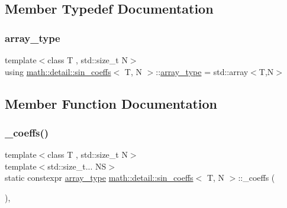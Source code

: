 \subsection{Member Typedef Documentation}
\mbox{\label{structmath_1_1detail_1_1sin__coeffs_a6d08252591f05c40e48bf7931b2eb135}} 
\subsubsection{\texorpdfstring{array\+\_\+type}{array\_type}}
{\footnotesize\ttfamily template$<$class T , std\+::size\+\_\+t N$>$ \\
using \hyperlink{structmath_1_1detail_1_1sin__coeffs}{math\+::detail\+::sin\+\_\+coeffs}$<$ T, N $>$\+::\hyperlink{structmath_1_1detail_1_1sin__coeffs_a6d08252591f05c40e48bf7931b2eb135}{array\+\_\+type} =  std\+::array$<$T,N$>$}



\subsection{Member Function Documentation}
\mbox{\label{structmath_1_1detail_1_1sin__coeffs_a1c5e8b54d12b2320c994c4eaf7b69b61}} 
\subsubsection{\texorpdfstring{\+\_\+coeffs()}{\_coeffs()}}
{\footnotesize\ttfamily template$<$class T , std\+::size\+\_\+t N$>$ \\
template$<$std\+::size\+\_\+t... NS$>$ \\
static constexpr \hyperlink{structmath_1_1detail_1_1sin__coeffs_a6d08252591f05c40e48bf7931b2eb135}{array\+\_\+type} \hyperlink{structmath_1_1detail_1_1sin__coeffs}{math\+::detail\+::sin\+\_\+coeffs}$<$ T, N $>$\+::\+\_\+coeffs (\begin{DoxyParamCaption}\item[{\hyperlink{structmath_1_1detail_1_1seq}{seq}$<$ N\+S... $>$}]{ }\end{DoxyParamCaption})\hspace{0.3cm}{\ttfamily [inline]}, {\ttfamily [static]}}

